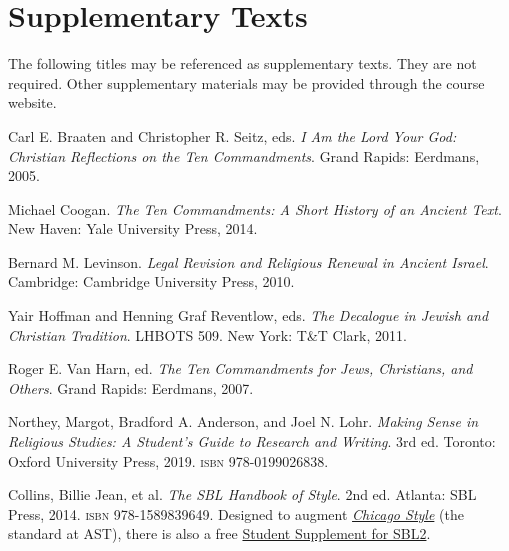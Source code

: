 \documentclass[titlepage]{article}
\begin{document}
\section{Supplementary Texts}
\label{supplementary}

The following titles may be referenced as supplementary texts. They are
not required. Other supplementary materials may be provided through the
course website.

\begingroup
\renewcommand{\section}[2]{}%
\begin{thebibliography}{3}%

	 Carl E. Braaten and Christopher R. Seitz, eds.
	\emph{I Am the Lord Your God: Christian Reflections on the Ten Commandments}.
	Grand Rapids: Eerdmans, 2005.%

	 Michael Coogan.
    \emph{The Ten Commandments: A Short History of an Ancient Text}.
    New Haven: Yale University Press, 2014.%

	 Bernard M. Levinson.
	\emph{Legal Revision and Religious Renewal in Ancient Israel}.
	Cambridge: Cambridge University Press, 2010.

	 Yair Hoffman and Henning Graf Reventlow, eds.
	\emph{The Decalogue in Jewish and Christian Tradition}.
	LHBOTS 509. New York: T\&T Clark, 2011.

	 Roger E. Van Harn, ed.
	\emph{The Ten Commandments for Jews, Christians, and Others}.
	Grand Rapids: Eerdmans, 2007.

	 Northey, Margot, Bradford A. Anderson, and Joel N. Lohr.
	\emph{Making Sense in Religious Studies: A Student's Guide to Research and Writing}.
	3rd ed. Toronto: Oxford University Press, 2019. \textsc{isbn} 978-0199026838.

	 Collins, Billie Jean, et al.
	\emph{The SBL Handbook of Style}.
	2nd ed. Atlanta: SBL Press, 2014. \textsc{isbn} 978-1589839649.
	Designed to augment \href{http://www.chicagomanualofstyle.org/home.html}{\emph{Chicago Style}}
	(the standard at AST), there is also a free
	\href{https://www.sbl-site.org/assets/pdfs/pubs/SBLHSsupp2015-02.pdf}{Student Supplement for SBL2}.


\end{thebibliography}
\endgroup
\end{document}
